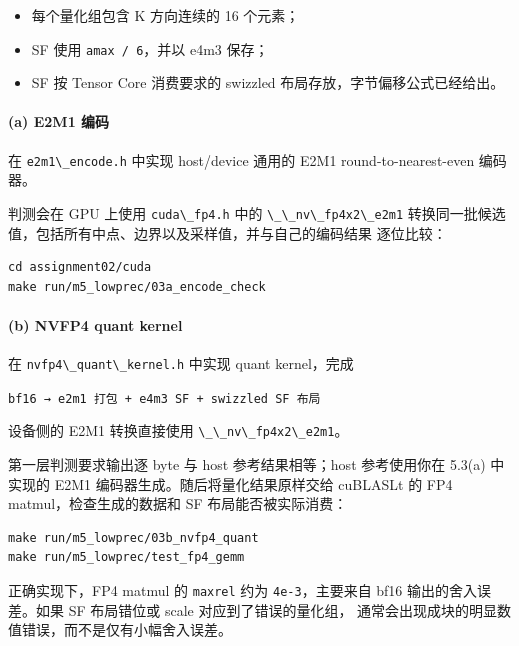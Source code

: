 \documentclass[11pt,a4paper,fontset=none]{ctexart}
\providecommand{\tightlist}{\setlength{\itemsep}{0pt}\setlength{\parskip}{0pt}}
\providecommand{\passthrough}[1]{#1}
\begin{document}
\begin{itemize}
\tightlist
\item
  每个量化组包含 K 方向连续的 16 个元素；
\item
  SF 使用 \passthrough{\lstinline!amax / 6!}，并以 e4m3 保存；
\item
  SF 按 Tensor Core 消费要求的 swizzled 布局存放，字节偏移公式已经给出。
\end{itemize}

\paragraph{(a) E2M1 编码}\label{a-e2m1-ux7f16ux7801}

在 \passthrough{\lstinline!e2m1\_encode.h!} 中实现 host/device 通用的
E2M1 round-to-nearest-even 编码器。

判测会在 GPU 上使用 \passthrough{\lstinline!cuda\_fp4.h!} 中的
\passthrough{\lstinline!\_\_nv\_fp4x2\_e2m1!}
转换同一批候选值，包括所有中点、边界以及采样值，并与自己的编码结果
逐位比较：

\begin{lstlisting}
cd assignment02/cuda
make run/m5_lowprec/03a_encode_check
\end{lstlisting}

\paragraph{(b) NVFP4 quant kernel}\label{b-nvfp4-quant-kernel}

在 \passthrough{\lstinline!nvfp4\_quant\_kernel.h!} 中实现 quant
kernel，完成

\passthrough{\lstinline!bf16 → e2m1 打包 + e4m3 SF + swizzled SF 布局!}

设备侧的 E2M1 转换直接使用
\passthrough{\lstinline!\_\_nv\_fp4x2\_e2m1!}。

第一层判测要求输出逐 byte 与 host 参考结果相等；host 参考使用你在 5.3(a)
中实现的 E2M1 编码器生成。随后将量化结果原样交给 cuBLASLt 的 FP4
matmul，检查生成的数据和 SF 布局能否被实际消费：

\begin{lstlisting}
make run/m5_lowprec/03b_nvfp4_quant
make run/m5_lowprec/test_fp4_gemm
\end{lstlisting}

正确实现下，FP4 matmul 的 \passthrough{\lstinline!maxrel!} 约为
\passthrough{\lstinline!4e-3!}，主要来自 bf16 输出的舍入误差。如果 SF
布局错位或 scale 对应到了错误的量化组，
通常会出现成块的明显数值错误，而不是仅有小幅舍入误差。
\end{document}
